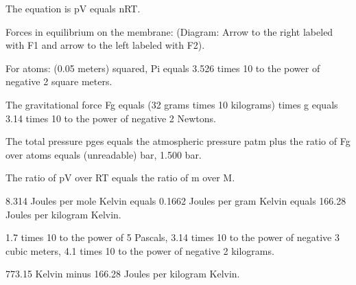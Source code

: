 The equation is pV equals nRT.

Forces in equilibrium on the membrane: (Diagram: Arrow to the right labeled with F1 and arrow to the left labeled with F2).

For atoms: (0.05 meters) squared, Pi equals 3.526 times 10 to the power of negative 2 square meters.

The gravitational force Fg equals (32 grams times 10 kilograms) times g equals 3.14 times 10 to the power of negative 2 Newtons.

The total pressure pges equals the atmospheric pressure patm plus the ratio of Fg over atoms equals (unreadable) bar, 1.500 bar.

The ratio of pV over RT equals the ratio of m over M.

8.314 Joules per mole Kelvin equals 0.1662 Joules per gram Kelvin equals 166.28 Joules per kilogram Kelvin.

1.7 times 10 to the power of 5 Pascals, 3.14 times 10 to the power of negative 3 cubic meters, 4.1 times 10 to the power of negative 2 kilograms.

773.15 Kelvin minus 166.28 Joules per kilogram Kelvin.